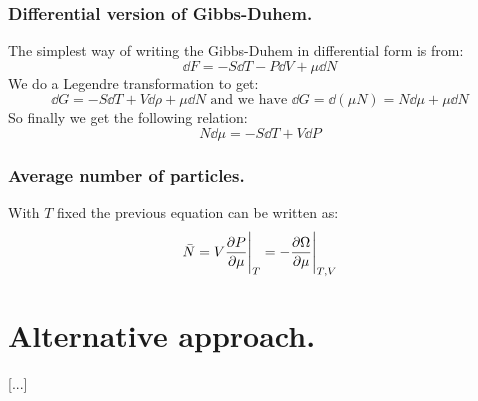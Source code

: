\documentclass[10pt,a4paper]{book}
\begin{document}
\subsubsection{Differential version of Gibbs-Duhem.}
The simplest way of writing the Gibbs-Duhem in differential form is from:
\[
\dd F = - S\dd T - P\dd V + \mu \dd N
\]
We do a Legendre transformation to get:
\[
\dd G = - S\dd T + V \dd \rho + \mu \dd N \text{ and we have } \dd G = \dd (\mu N) = N \dd \mu + \mu \dd N
\]
So finally we get the following relation:
\[
N \dd \mu = - S \dd T + V \dd P
\]

\subsubsection{Average number of particles.}
With $T$ fixed the previous equation can be written as:
\[
\bar{N} = V \pdv{P}{\mu} \Bigg|_T = - \pdv{\Omega}{\mu}\Bigg|_{T, V}
\]

\section{Alternative approach.}
[...]
\end{document}
